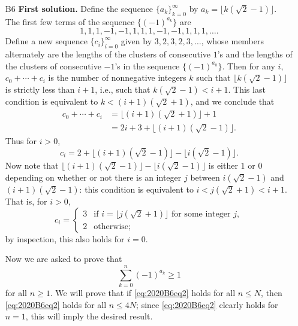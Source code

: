 \documentclass[amssymb,twocolumn,pra,10pt,aps]{revtex4-1}
\begin{document}
\begin{itemize}
\item[B6]
\noindent
\textbf{First solution.}
Define the sequence $\{a_k\}_{k=0}^\infty$ by $a_k = \lfloor k(\sqrt{2}-1)\rfloor$. The first few terms of the sequence $\{(-1)^{a_k}\}$ are
\[
1,1,1,-1,-1,1,1,1,-1,-1,1,1,1,\ldots.
\]
Define a new sequence $\{c_i\}_{i=0}^\infty$ given by $3,2,3,2,3,\ldots$, whose members alternately are the lengths of the clusters of consecutive $1$'s and the lengths of the clusters of consecutive $-1$'s in the sequence $\{(-1)^{a_k}\}$. Then for any $i$, $c_0+\cdots+c_i$ is the number of nonnegative integers $k$ such that $\lfloor k(\sqrt{2}-1) \rfloor$ is strictly less than $i+1$, i.e., such that $k(\sqrt{2}-1)<i+1$. This last condition is equivalent to $k<(i+1)(\sqrt{2}+1)$, and we conclude that \begin{align*}
c_0+\cdots+c_i &= \lfloor (i+1)(\sqrt{2}+1)\rfloor  + 1 \\
&= 2i+3+\lfloor (i+1)(\sqrt{2}-1)\rfloor.
\end{align*}
Thus for $i>0$,
\begin{equation} \label{eq:2020B6eq1}
c_i =2+\lfloor (i+1)(\sqrt{2}-1)\rfloor-\lfloor i(\sqrt{2}-1) \rfloor.
\end{equation}
Now note that $\lfloor (i+1)(\sqrt{2}-1)\rfloor-\lfloor i(\sqrt{2}-1) \rfloor$ is either $1$ or $0$ depending on whether or not there is an integer $j$ between $i(\sqrt{2}-1)$ and $(i+1)(\sqrt{2}-1)$: this condition is equivalent to $i<j(\sqrt{2}+1)<i+1$. That is, for $i>0$,
\begin{equation} \label{eq:2020B6eq3}
c_i = \begin{cases} 3 & \text{if } i=\lfloor j(\sqrt{2}+1)\rfloor \text{ for some integer }j, \\
2 &\text{otherwise};
\end{cases}
\end{equation}
by inspection, this also holds for $i=0$.

Now we are asked to prove that
\begin{equation}\label{eq:2020B6eq2}
\sum_{k=0}^n (-1)^{a_k} \geq 1
\end{equation}
for all $n\geq 1$. We will prove that if \eqref{eq:2020B6eq2} holds for all $n\leq N$, then \eqref{eq:2020B6eq2} holds for all $n\leq 4N$; since \eqref{eq:2020B6eq2} clearly holds for $n=1$, this will imply the desired result.


\end{itemize}
\end{document}
